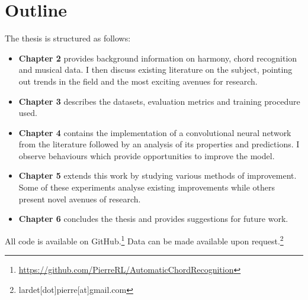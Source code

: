 \section{Outline}

The thesis is structured as follows:

\begin{itemize}
    \item \textbf{Chapter 2} provides background information on harmony, chord recognition and musical data. I then discuss existing literature on the subject, pointing out trends in the field and the most exciting avenues for research.
    \item \textbf{Chapter 3} describes the datasets, evaluation metrics and training procedure used.
    \item \textbf{Chapter 4} contains the implementation of a convolutional neural network from the literature followed by an analysis of its properties and predictions. I observe behaviours which provide opportunities to improve the model. 
    \item \textbf{Chapter 5} extends this work by studying various methods of improvement. Some of these experiments analyse existing improvements while others present novel avenues of research.
    \item \textbf{Chapter 6} concludes the thesis and provides suggestions for future work.
\end{itemize}

\vspace{0.5cm}

All code is available on GitHub.\footnote{\url{https://github.com/PierreRL/AutomaticChordRecognition}} Data can be made available upon request.\footnote{lardet[dot]pierre[at]gmail.com}